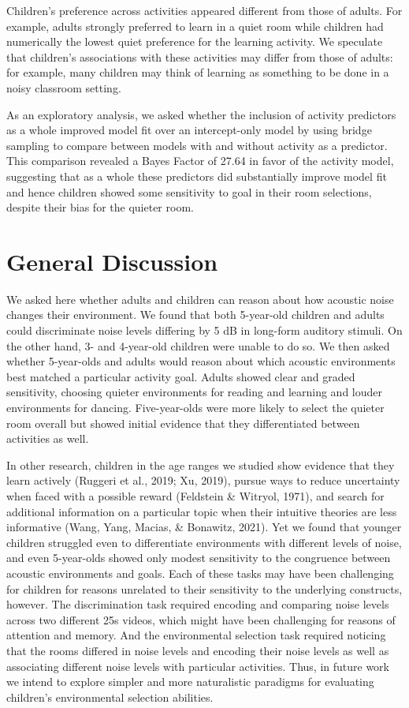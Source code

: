 \documentclass[10pt, letterpaper]{article}
\begin{document}
Children's preference across activities appeared different from those of
adults. For example, adults strongly preferred to learn in a quiet room
while children had numerically the lowest quiet preference for the
learning activity. We speculate that children's associations with these
activities may differ from those of adults: for example, many children
may think of learning as something to be done in a noisy classroom
setting.

As an exploratory analysis, we asked whether the inclusion of activity
predictors as a whole improved model fit over an intercept-only model by
using bridge sampling to compare between models with and without
activity as a predictor. This comparison revealed a Bayes Factor of
27.64 in favor of the activity model, suggesting that as a whole these
predictors did substantially improve model fit and hence children showed
some sensitivity to goal in their room selections, despite their bias
for the quieter room.

\hypertarget{general-discussion}{%
\section{General Discussion}\label{general-discussion}}

We asked here whether adults and children can reason about how acoustic
noise changes their environment. We found that both 5-year-old children
and adults could discriminate noise levels differing by 5 dB in
long-form auditory stimuli. On the other hand, 3- and 4-year-old
children were unable to do so. We then asked whether 5-year-olds and
adults would reason about which acoustic environments best matched a
particular activity goal. Adults showed clear and graded sensitivity,
choosing quieter environments for reading and learning and louder
environments for dancing. Five-year-olds were more likely to select the
quieter room overall but showed initial evidence that they
differentiated between activities as well.

In other research, children in the age ranges we studied show evidence
that they learn actively (Ruggeri et al., 2019; Xu, 2019), pursue ways
to reduce uncertainty when faced with a possible reward (Feldstein \&
Witryol, 1971), and search for additional information on a particular
topic when their intuitive theories are less informative (Wang, Yang,
Macias, \& Bonawitz, 2021). Yet we found that younger children struggled
even to differentiate environments with different levels of noise, and
even 5-year-olds showed only modest sensitivity to the congruence
between acoustic environments and goals. Each of these tasks may have
been challenging for children for reasons unrelated to their sensitivity
to the underlying constructs, however. The discrimination task required
encoding and comparing noise levels across two different 25s videos,
which might have been challenging for reasons of attention and memory.
And the environmental selection task required noticing that the rooms
differed in noise levels and encoding their noise levels as well as
associating different noise levels with particular activities. Thus, in
future work we intend to explore simpler and more naturalistic paradigms
for evaluating children's environmental selection abilities.
\end{document}

